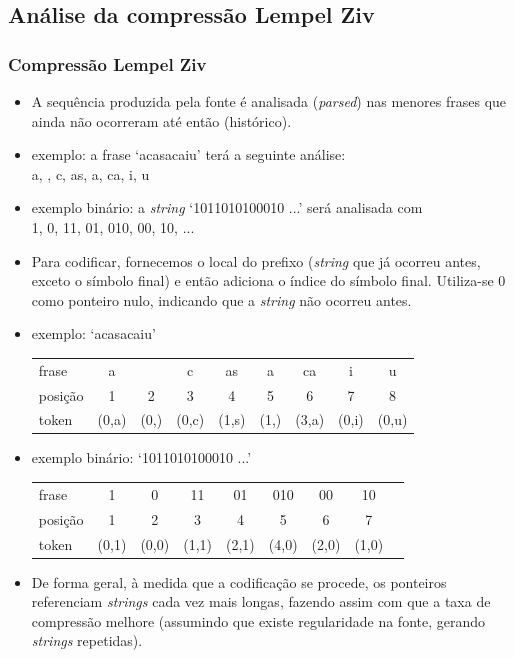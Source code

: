 \subsection{Análise da compressão Lempel Ziv}
\begin{frame}[allowframebreaks]
  \frametitle{Compressão Lempel Ziv}

  \begin{itemize}
  \item A sequência produzida pela fonte é analisada (\textit{parsed})
	nas menores frases que ainda não ocorreram até então (histórico).
  \item exemplo: a frase `a\textvisiblespace casa\textvisiblespace caiu'
	terá a seguinte análise: \\
	a, \textvisiblespace, c, as, a\textvisiblespace, ca, i, u
  \item exemplo binário: a \textit{string} `1011010100010 ...' será analisada com\\
	1, 0, 11, 01, 010, 00, 10, ...

  \item Para codificar, fornecemos o local do prefixo (\textit{string} que já
	ocorreu antes, exceto o símbolo final) e então adiciona o índice do
	símbolo final. Utiliza-se $0$ como ponteiro nulo, indicando que a \textit{string}
	não ocorreu antes.

  \item exemplo: `a\textvisiblespace casa\textvisiblespace caiu' \\
	\begin{tabular}{lcccccccc}
	frase   & a 	& \textvisiblespace 	& c 	& as 	& a\textvisiblespace 	& ca 	& i 	& u \\
	posição & 1 	& 2			& 3 	& 4 	& 5 			& 6 	& 7 	& 8 \\
	token   & (0,a) & (0,\textvisiblespace) & (0,c) & (1,s) & (1,\textvisiblespace)	& (3,a) & (0,i) & (0,u) 
	\end{tabular}

  \item exemplo binário: `1011010100010 ...' \\
	\begin{tabular}{lcccccccc}
        frase   & 1	& 0	& 11	& 01	& 010	& 00	& 10	\\ 
	posição & 1 	& 2 	& 3 	& 4	& 5	& 6 	& 7	\\
	token   & (0,1) & (0,0) & (1,1) & (2,1) & (4,0) & (2,0) & (1,0) 
	\end{tabular}

  \item De forma geral, à medida que a codificação se procede, os ponteiros referenciam
	\textit{strings} cada vez mais longas, fazendo assim com que a taxa de compressão melhore
	(assumindo que existe regularidade na fonte, gerando \textit{strings} repetidas).
  \end{itemize}

\end{frame}


